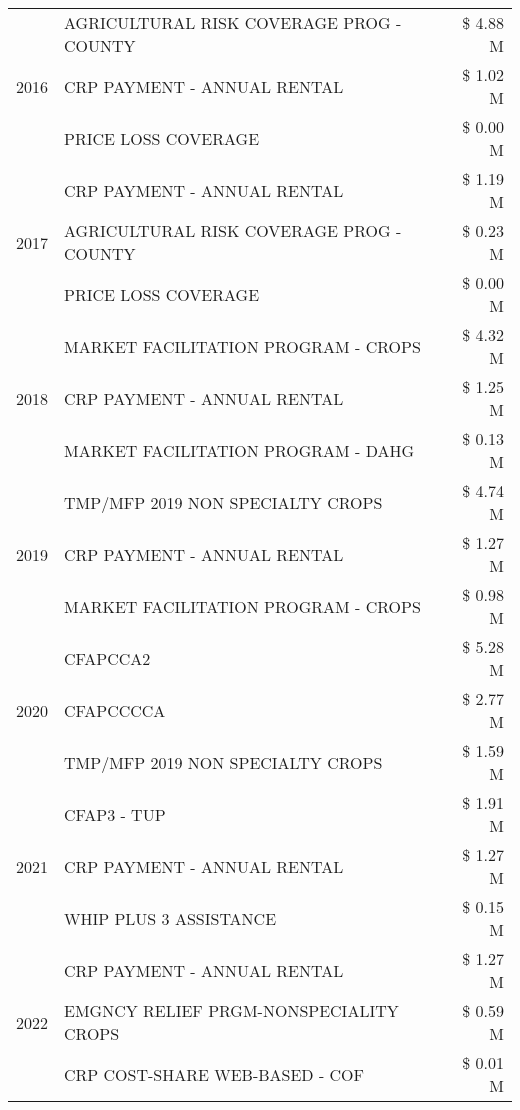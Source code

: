 \begin{tabular}{llr}
\cline{1-3}
\multirow[t]{3}{*}{2016} & AGRICULTURAL RISK COVERAGE PROG - COUNTY & \$ 4.88 M \\
 & CRP PAYMENT - ANNUAL RENTAL & \$ 1.02 M \\
 & PRICE LOSS COVERAGE & \$ 0.00 M \\
\cline{1-3}
\multirow[t]{3}{*}{2017} & CRP PAYMENT - ANNUAL RENTAL & \$ 1.19 M \\
 & AGRICULTURAL RISK COVERAGE PROG - COUNTY & \$ 0.23 M \\
 & PRICE LOSS COVERAGE & \$ 0.00 M \\
\cline{1-3}
\multirow[t]{3}{*}{2018} & MARKET FACILITATION PROGRAM - CROPS & \$ 4.32 M \\
 & CRP PAYMENT - ANNUAL RENTAL & \$ 1.25 M \\
 & MARKET FACILITATION PROGRAM - DAHG & \$ 0.13 M \\
\cline{1-3}
\multirow[t]{3}{*}{2019} & TMP/MFP 2019 NON SPECIALTY CROPS & \$ 4.74 M \\
 & CRP PAYMENT - ANNUAL RENTAL & \$ 1.27 M \\
 & MARKET FACILITATION PROGRAM - CROPS & \$ 0.98 M \\
\cline{1-3}
\multirow[t]{3}{*}{2020} & CFAPCCA2 & \$ 5.28 M \\
 & CFAPCCCCA & \$ 2.77 M \\
 & TMP/MFP 2019 NON SPECIALTY CROPS & \$ 1.59 M \\
\cline{1-3}
\multirow[t]{3}{*}{2021} & CFAP3 - TUP & \$ 1.91 M \\
 & CRP PAYMENT - ANNUAL RENTAL & \$ 1.27 M \\
 & WHIP PLUS 3 ASSISTANCE & \$ 0.15 M \\
\cline{1-3}
\multirow[t]{3}{*}{2022} & CRP PAYMENT - ANNUAL RENTAL & \$ 1.27 M \\
 & EMGNCY RELIEF PRGM-NONSPECIALITY CROPS & \$ 0.59 M \\
 & CRP COST-SHARE WEB-BASED - COF & \$ 0.01 M \\
\cline{1-3}
\bottomrule
\end{tabular}
